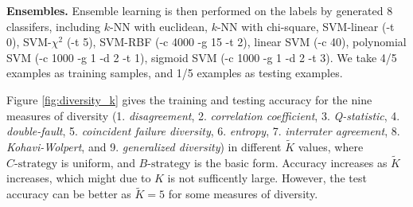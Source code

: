 \textbf{Ensembles.} Ensemble learning is then performed on the labels by generated 8 classifers, including $k$-NN with euclidean, $k$-NN with chi-square, SVM-linear (-t 0), SVM-$\chi^2$ (-t 5), SVM-RBF (-c 4000 -g 15 -t 2), linear SVM (-c 40), polynomial SVM (-c 1000 -g 1 -d 2 -t 1), sigmoid SVM (-c 1000 -g 1 -d 2 -t 3). We take 4/5 examples as training samples, and 1/5 examples as testing examples.


Figure \ref{fig:diversity_k} gives the training and testing accuracy for the nine measures of diversity (1. \emph{disagreement}, 2. \emph{correlation coefficient}, 3. \emph{Q-statistic}, 4. \emph{double-fault}, 5. \emph{coincident failure diversity}, 6. \emph{entropy}, 7. \emph{interrater agreement}, 8. \emph{Kohavi-Wolpert}, and 9. \emph{generalized diversity}) in different $\tilde{K}$ values, where $C\text{-strategy}$ is uniform, and $B\text{-strategy}$ is the basic form. Accuracy increases as $\tilde{K}$ increases, which might due to $K$ is not sufficently large. However, the test accuracy can be better as
$\tilde{K}=5$ for some measures of diversity.

